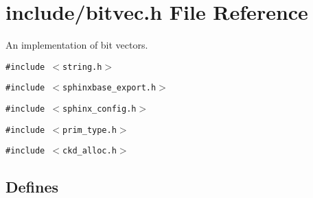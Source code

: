 \section{include/bitvec.h File Reference}
\label{bitvec_8h}
An implementation of bit vectors.  


{\tt \#include $<$string.h$>$}\par
{\tt \#include $<$sphinxbase\_\-export.h$>$}\par
{\tt \#include $<$sphinx\_\-config.h$>$}\par
{\tt \#include $<$prim\_\-type.h$>$}\par
{\tt \#include $<$ckd\_\-alloc.h$>$}\par
\subsection*{Defines}
